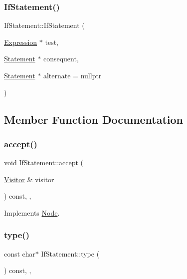 \subsubsection{\texorpdfstring{If\+Statement()}{IfStatement()}}
{\footnotesize\ttfamily If\+Statement\+::\+If\+Statement (\begin{DoxyParamCaption}\item[{\hyperlink{struct_expression}{Expression} $\ast$}]{test,  }\item[{\hyperlink{struct_statement}{Statement} $\ast$}]{consequent,  }\item[{\hyperlink{struct_statement}{Statement} $\ast$}]{alternate = {\ttfamily nullptr} }\end{DoxyParamCaption})\hspace{0.3cm}{\ttfamily [inline]}}



\subsection{Member Function Documentation}
\mbox{\label{struct_if_statement_a3b9cacb85a094dfe27646324769a1d2f}} 
\subsubsection{\texorpdfstring{accept()}{accept()}}
{\footnotesize\ttfamily void If\+Statement\+::accept (\begin{DoxyParamCaption}\item[{\hyperlink{struct_visitor}{Visitor} \&}]{visitor }\end{DoxyParamCaption}) const\hspace{0.3cm}{\ttfamily [inline]}, {\ttfamily [override]}, {\ttfamily [virtual]}}



Implements \hyperlink{struct_node_a10bd7af968140bbf5fa461298a969c71}{Node}.

\mbox{\label{struct_if_statement_a385e3770ad7768e8ccc370363d61dfe8}} 
\subsubsection{\texorpdfstring{type()}{type()}}
{\footnotesize\ttfamily const char$\ast$ If\+Statement\+::type (\begin{DoxyParamCaption}{ }\end{DoxyParamCaption}) const\hspace{0.3cm}{\ttfamily [inline]}, {\ttfamily [override]}, {\ttfamily [virtual]}}



